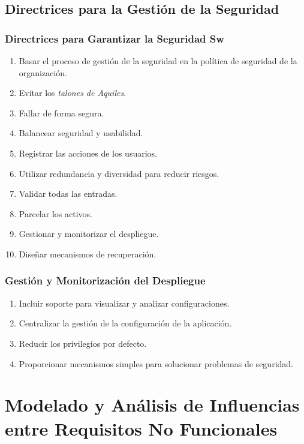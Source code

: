 \documentclass[handout,a4paper,slidestop,xcolor=pst,dvips,blue]{beamer}
\begin{document}
\subsection{Directrices para la Gestión de la Seguridad}

\begin{frame}[c]
    \frametitle{Directrices para Garantizar la Seguridad Sw}
    \begin{enumerate}[<+->]
        \item Basar el proceso de gestión de la seguridad en la política de seguridad de la organización.
        \item Evitar los \emph{talones de Aquiles}.
        \item Fallar de forma segura.
        \item Balancear seguridad y usabilidad.
        \item Registrar las acciones de los usuarios.
        \item Utilizar redundancia y diversidad para reducir riesgos.
        \item Validar todas las entradas.
        \item Parcelar los activos.
        \item Gestionar y monitorizar el despliegue.
        \item Diseñar mecanismos de recuperación.
    \end{enumerate}
\end{frame}

\begin{frame}[c]
    \frametitle{Gestión y Monitorización del Despliegue}
    \begin{enumerate}[<+->]
        \item Incluir soporte para visualizar y analizar configuraciones.
        \item Centralizar la gestión de la configuración de la aplicación.
        \item Reducir los privilegios por defecto.
        \item Proporcionar mecanismos simples para solucionar problemas de seguridad.
    \end{enumerate}
\end{frame}


\section[Influencias entre Requisitos No Funcionales]{Modelado y Análisis de Influencias entre Requisitos No Funcionales}
\end{document}
